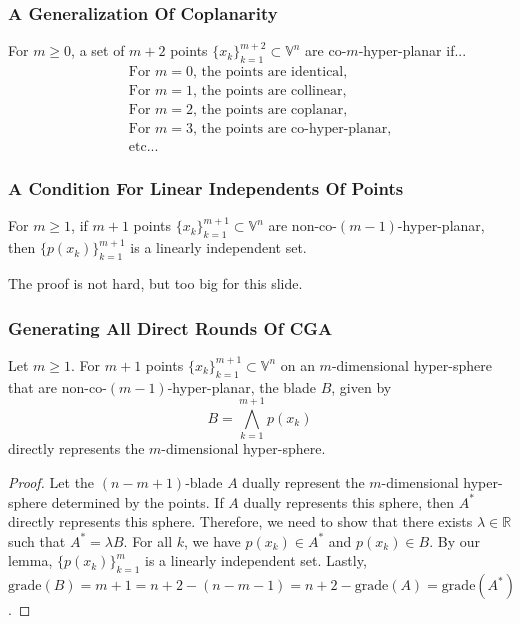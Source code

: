 \documentclass{beamer}
\newcommand{\V}{\mathbb{V}}
\newcommand{\R}{\mathbb{R}}
\newcommand{\grade}{\mbox{grade}}
\begin{document}
\begin{frame}
\frametitle{A Generalization Of Coplanarity}
\begin{definition}
For $m\geq 0$, a set of $m+2$ points $\{x_k\}_{k=1}^{m+2}\subset\V^n$ are \alert{co-$m$-hyper-planar} if...
\begin{equation*}
\begin{array}{l}
\mbox{For $m=0$, the points are identical,} \\
\mbox{For $m=1$, the points are collinear,} \\
\mbox{For $m=2$, the points are coplanar,} \\
\mbox{For $m=3$, the points are co-hyper-planar,} \\
\mbox{etc...}
\end{array}
\end{equation*}
\end{definition}
\end{frame}

\begin{frame}
\frametitle{A Condition For Linear Independents Of Points}
\begin{lemma}
For $m\geq 1$, if $m+1$ points $\{x_k\}_{k=1}^{m+1}\subset\V^n$ are non-co-$(m-1)$-hyper-planar,
then $\{p(x_k)\}_{k=1}^{m+1}$ is a linearly independent set.
\end{lemma}
The proof is not hard, but too big for this slide.
\end{frame}

\begin{frame}
\frametitle{Generating All \alert{Direct Rounds} Of CGA}
Let $m\geq 1$.
For $m+1$ points $\{x_k\}_{k=1}^{m+1}\subset\V^n$ on an $m$-dimensional
hyper-sphere that are non-co-$(m-1)$-hyper-planar,
the blade $B$, given by
\begin{equation*}
B = \bigwedge_{k=1}^{m+1} p(x_k)
\end{equation*}
\alert{directly} represents the $m$-dimensional hyper-sphere.
\begin{proof}
Let the $(n-m+1)$-blade $A$ \alert{dually} represent the $m$-dimensional hyper-sphere determined by the points.
If $A$ \alert{dually} represents this sphere, then $A^*$ \alert{directly} represents this sphere.
Therefore, we need to show that there exists $\lambda\in\R$ such that $A^*=\lambda B$.
For all $k$, we have $p(x_k)\in A^*$ and $p(x_k)\in B$.
By our lemma, $\{p(x_k)\}_{k=1}^m$ is a linearly independent set.
Lastly, $\grade(B) = m+1 = n+2-(n-m-1) = n+2-\grade(A) = \grade(A^*)$.
\end{proof}
\end{frame}
\end{document}
